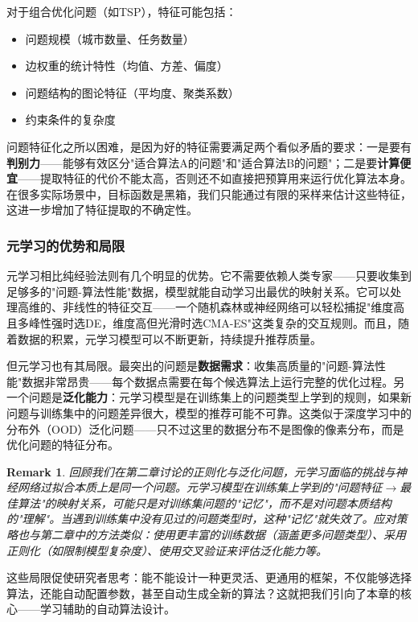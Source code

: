 \documentclass[lang=cn,zihao=-4,a4paper,fontset=windows]{beautybook}
\newtheorem*{remark}{\textbf{Remark}}
\begin{document}
对于组合优化问题（如TSP），特征可能包括：
\begin{itemize}
    \item 问题规模（城市数量、任务数量）
    \item 边权重的统计特性（均值、方差、偏度）
    \item 问题结构的图论特征（平均度、聚类系数）
    \item 约束条件的复杂度
\end{itemize}

问题特征化之所以困难，是因为好的特征需要满足两个看似矛盾的要求：一是要有\textbf{判别力}——能够有效区分"适合算法A的问题"和"适合算法B的问题"；二是要\textbf{计算便宜}——提取特征的代价不能太高，否则还不如直接把预算用来运行优化算法本身。在很多实际场景中，目标函数是黑箱，我们只能通过有限的采样来估计这些特征，这进一步增加了特征提取的不确定性。

\subsubsection{元学习的优势和局限}

元学习相比纯经验法则有几个明显的优势。它不需要依赖人类专家——只要收集到足够多的"问题-算法性能"数据，模型就能自动学习出最优的映射关系。它可以处理高维的、非线性的特征交互——一个随机森林或神经网络可以轻松捕捉"维度高且多峰性强时选DE，维度高但光滑时选CMA-ES"这类复杂的交互规则。而且，随着数据的积累，元学习模型可以不断更新，持续提升推荐质量。

但元学习也有其局限。最突出的问题是\textbf{数据需求}：收集高质量的"问题-算法性能"数据非常昂贵——每个数据点需要在每个候选算法上运行完整的优化过程。另一个问题是\textbf{泛化能力}：元学习模型是在训练集上的问题类型上学到的规则，如果新问题与训练集中的问题差异很大，模型的推荐可能不可靠。这类似于深度学习中的分布外（OOD）泛化问题——只不过这里的数据分布不是图像的像素分布，而是优化问题的特征分布。

\begin{remark}
回顾我们在第二章讨论的正则化与泛化问题，元学习面临的挑战与神经网络过拟合本质上是同一个问题。元学习模型在训练集上学到的"问题特征$\to$最佳算法"的映射关系，可能只是对训练集问题的"记忆"，而不是对问题本质结构的"理解"。当遇到训练集中没有见过的问题类型时，这种"记忆"就失效了。应对策略也与第二章中的方法类似：使用更丰富的训练数据（涵盖更多问题类型）、采用正则化（如限制模型复杂度）、使用交叉验证来评估泛化能力等。
\end{remark}

这些局限促使研究者思考：能不能设计一种更灵活、更通用的框架，不仅能够选择算法，还能自动配置参数，甚至自动生成全新的算法？这就把我们引向了本章的核心——学习辅助的自动算法设计。
\end{document}
